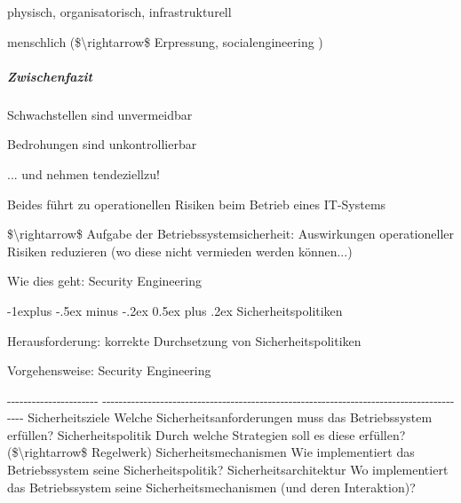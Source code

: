 \documentclass[a4paper]{article}
\makeatletter
\renewcommand{\subsection}{\@startsection{subsection}{2}{0mm}%
 {-1explus -.5ex minus -.2ex}%
 {0.5ex plus .2ex}%
 {\normalfont\normalsize\bfseries}}
\makeatother
\begin{document}
\begin{multicols}{3}
    \begin{itemize*}
        \item
        physisch, organisatorisch, infrastrukturell
        \item
        menschlich (\$\textbackslash rightarrow\$ Erpressung,
        socialengineering )
    \end{itemize*}


    \subparagraph{Zwischenfazit}

    \begin{itemize*}
        \item
        Schwachstellen sind unvermeidbar
        \item
        Bedrohungen sind unkontrollierbar
        \begin{itemize*}
            \item ... und nehmen tendeziellzu!
        \end{itemize*}
    \end{itemize*}

    Beides führt zu operationellen Risiken beim Betrieb eines IT-Systems

    \$\textbackslash rightarrow\$ Aufgabe der Betriebssystemsicherheit:
    Auswirkungen operationeller Risiken reduzieren (wo diese nicht vermieden
    werden können...)

    Wie dies geht: Security Engineering


    \subsection{Sicherheitspolitiken}

    \begin{itemize*}
        \item
        Herausforderung: korrekte Durchsetzung von Sicherheitspolitiken
        \item
        Vorgehensweise: Security Engineering
    \end{itemize*}

    \textbar{} \textbar{} \textbar{}
    -\/-\/-\/-\/-\/-\/-\/-\/-\/-\/-\/-\/-\/-\/-\/-\/-\/-\/-\/-\/-\/-
    \textbar{}
    -\/-\/-\/-\/-\/-\/-\/-\/-\/-\/-\/-\/-\/-\/-\/-\/-\/-\/-\/-\/-\/-\/-\/-\/-\/-\/-\/-\/-\/-\/-\/-\/-\/-\/-\/-\/-\/-\/-\/-\/-\/-\/-\/-\/-\/-\/-\/-\/-\/-\/-\/-\/-\/-\/-\/-\/-\/-\/-\/-\/-\/-\/-\/-\/-\/-\/-\/-\/-\/-\/-\/-\/-\/-\/-\/-\/-\/-\/-\/-\/-\/-\/-\/-\/-\/-\/-\/-\/-
    \textbar{} \textbar{} Sicherheitsziele \textbar{} Welche
    Sicherheitsanforderungen muss das Betriebssystem erfüllen? \textbar{}
    \textbar{} Sicherheitspolitik \textbar{} Durch welche Strategien soll es
    diese erfüllen? (\$\textbackslash rightarrow\$ Regelwerk) \textbar{}
    \textbar{} Sicherheitsmechanismen \textbar{} Wie implementiert das
    Betriebssystem seine Sicherheitspolitik? \textbar{} \textbar{}
    Sicherheitsarchitektur \textbar{} Wo implementiert das Betriebssystem
    seine Sicherheitsmechanismen (und deren Interaktion)? \textbar{}



\end{multicols}
\end{document}
